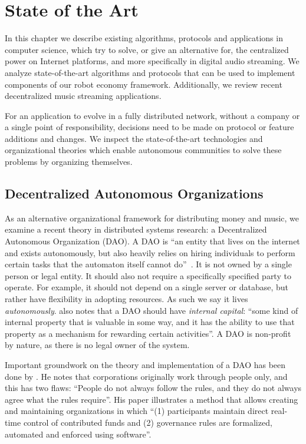 \chapter{\label{chap:state-of-the-art}State of the Art}
In this chapter we describe existing algorithms, protocols and applications in computer science, which try to solve, or give an alternative for, the centralized power on Internet platforms, and more specifically in digital audio streaming. We analyze state-of-the-art algorithms and protocols that can be used to implement components of our robot economy framework. Additionally, we review recent decentralized music streaming applications.

For an application to evolve in a fully distributed network, without a company or a single point of responsibility, decisions need to be made on protocol or feature additions and changes. We inspect the state-of-the-art technologies and organizational theories which enable autonomous communities to solve these problems by organizing themselves.

\section{Decentralized Autonomous Organizations}
\label{sec:dao}
As an alternative organizational framework for distributing money and music, we examine a recent theory in distributed systems research: a Decentralized Autonomous Organization (DAO).
A DAO is ``an entity that lives on the internet and exists autonomously, but also heavily relies on hiring individuals to perform certain tasks that the automaton itself cannot do''~\citep{buterin2014dao}. It is not owned by a single person or legal entity. It should also not require a specifically specified party to operate. For example, it should not depend on a single server or database, but rather have flexibility in adopting resources. As such we say it lives \textit{autonomously}. \cite{buterin2014dao} also notes that a DAO should have \textit{internal capital}: ``some kind of internal property that is valuable in some way, and it has the ability to use that property as a mechanism for rewarding certain activities''. A DAO is non-profit by nature, as there is no legal owner of the system.


Important groundwork on the theory and implementation of a DAO has been done by \cite{jentzsch2016decentralized}. He notes that corporations originally work through people only, and this has two flaws: ``People do not always follow the rules, and they do not always agree what the rules require''. His paper illustrates a method that allows creating and maintaining organizations in which ``(1) participants maintain direct real-time control of contributed funds and (2) governance rules are formalized, automated and enforced using software''.

